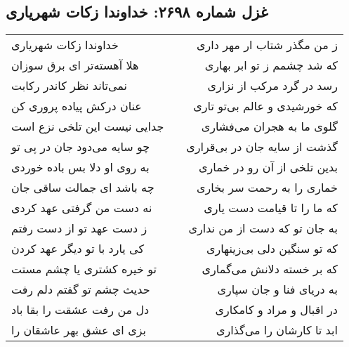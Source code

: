 \begin{center}
\section*{غزل شماره ۲۶۹۸: خداوندا زکات شهریاری}
\label{sec:2698}
\begin{longtable}{l p{0.5cm} r}
خداوندا زکات شهریاری
&&
ز من مگذر شتاب ار مهر داری
\\
هلا آهسته‌تر ای برق سوزان
&&
که شد چشمم ز تو ابر بهاری
\\
نمی‌تاند نظر کاندر رکابت
&&
رسد در گرد مرکب از نزاری
\\
عنان درکش پیاده پروری کن
&&
که خورشیدی و عالم بی‌تو تاری
\\
جدایی نیست این تلخی نزع است
&&
گلوی ما به هجران می‌فشاری
\\
چو سایه می‌دود جان در پی تو
&&
گذشت از سایه جان در بی‌قراری
\\
به روی او دلا بس باده خوردی
&&
بدین تلخی از آن رو در خماری
\\
چه باشد ای جمالت ساقی جان
&&
خماری را به رحمت سر بخاری
\\
نه دست من گرفتی عهد کردی
&&
که ما را تا قیامت دست یاری
\\
ز دست عهد تو از دست رفتم
&&
به جان تو که دست از من نداری
\\
کی یارد با تو دیگر عهد کردن
&&
که تو سنگین دلی بی‌زینهاری
\\
تو خیره کشتری یا چشم مستت
&&
که بر خسته دلانش می‌گماری
\\
حدیث چشم تو گفتم دلم رفت
&&
به دریای فنا و جان سپاری
\\
دل من رفت عشقت را بقا باد
&&
در اقبال و مراد و کامکاری
\\
بزی ای عشق بهر عاشقان را
&&
ابد تا کارشان را می‌گذاری
\\
\end{longtable}
\end{center}
